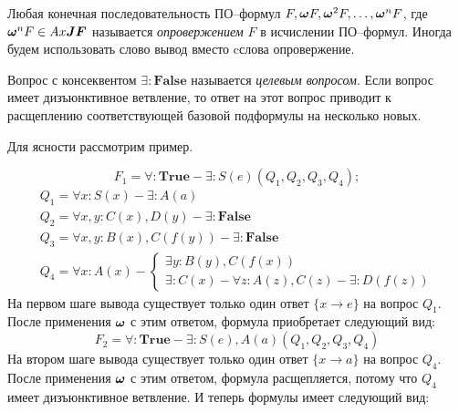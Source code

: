 %
Любая конечная последовательность ПО--формул $F, \boldsymbol{\omega} F, \boldsymbol{\omega}^2 F,\ldots,\boldsymbol{\omega}^n F$, где $\boldsymbol{\omega}^n F \in Ax\boldsymbol{JF}$ называется {\em опровержением} $F$ в исчислении ПО--формул. Иногда будем использовать слово вывод вместо cслова опровержение.

Вопрос с консеквентом $\exists:\boldsymbol{False}$ называется {\em целевым вопросом}. Если вопрос имеет дизъюнктивное ветвление, то ответ на этот вопрос приводит к расщеплению соответствующей базовой подформулы на несколько новых.

Для ясности рассмотрим пример.

\begin{example}\label{proofexample}


\begin{equation*}\label{ex:f1}
	F_1 = \forall\colon\boldsymbol{True} - \exists\colon S(e)(Q_1,Q_2,Q_3,Q_4);
\end{equation*}
\begin{equation*}
	\begin{array}{l}
	Q_1 = \forall x\colon S(x) - \exists\colon A(a) \\
	Q_2 = \forall x,y\colon C(x),D(y) - \exists\colon\boldsymbol{False} \\
	Q_3 = \forall x,y\colon B(x),C(f(y)) - \exists\colon\boldsymbol{False} \\
	Q_4 =
	\forall x\colon A(x) -
	\left\lbrace
	\begin{array}{l}
		\exists y\colon B(y),C(f(x)) \\
		\exists \colon C(x) - \forall z\colon A(z),C(z) - \exists\colon D(f(z))
	\end{array}\right.
	\end{array}
\end{equation*}
На первом шаге вывода существует только один ответ $\{x \rightarrow e\}$ на вопрос $Q_1$. После применения $\boldsymbol{\omega}$ с этим ответом, формула приобретает следующий вид:
\begin{equation*}\label{ex:f2}
	F_2 = \forall\colon\boldsymbol{True} - \exists\colon S(e),A(a)(Q_1,Q_2,Q_3,Q_4)
\end{equation*}
На втором шаге вывода существует только один ответ $\{x \rightarrow a\}$ на вопрос $Q_4$. После применения $\boldsymbol{\omega}$ с этим ответом, формула расщепляется, потому что $Q_4$ имеет дизъюнктивное ветвление. И теперь формулы имеет следующий вид:


\end{example}
